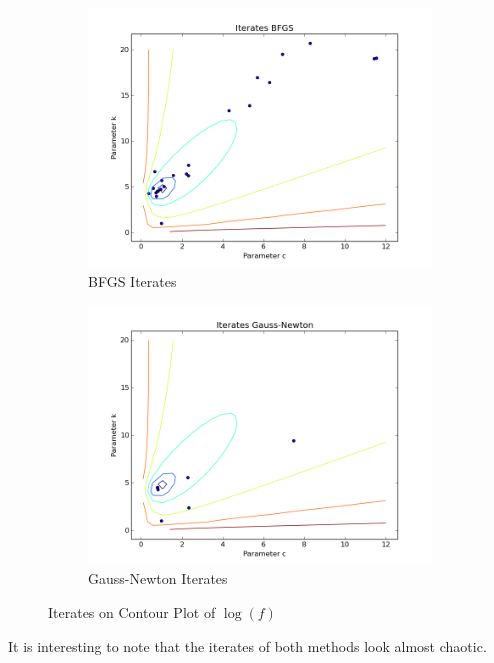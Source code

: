 \documentclass{article}
\begin{document}
\begin{figure}
    \centering
    \begin{subfigure}[b]{0.45\textwidth}
        \includegraphics[width=\textwidth]{scatter_bfgs}
        \caption{BFGS Iterates}
        \label{fig:g}
    \end{subfigure}
    \begin{subfigure}[b]{0.45\textwidth}
        \includegraphics[width=\textwidth]{scatter_gauss}
        \caption{Gauss-Newton Iterates}
        \label{fig:t}
    \end{subfigure}
    \caption{Iterates on Contour Plot of $\log(f)$}\label{fig:animals}
\label{iterates}
\end{figure}
It is interesting to note that the iterates of both methods look almost chaotic.
\end{document}
